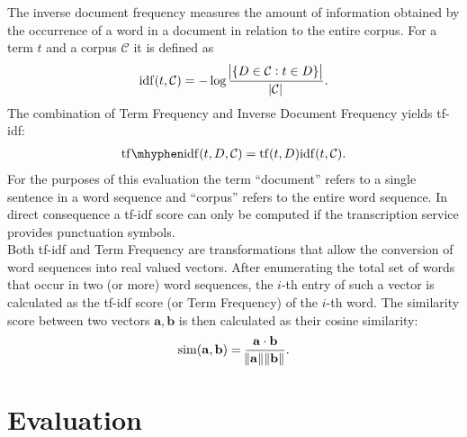 \documentclass[11pt]{article}
\begin{document}
The inverse document frequency measures the amount of information obtained by the occurrence of a word in a document in relation to the entire corpus.
For a term $t$ and a corpus $\mathcal{C}$ it is defined as
\begin{align}
	\mathrm{idf}(t, \mathcal{C}) = -\log \frac{\abs{\{D \in \mathcal{C} : t \in D\}}}{\abs{\mathcal{C}}}.
\end{align}
The combination of Term Frequency and Inverse Document Frequency yields tf-idf: 
\begin{align}
	\mathrm{tf\mhyphen idf}(t, D, \mathcal{C}) = \mathrm{tf}(t, D) \mathrm{idf}(t, \mathcal{C}).
\end{align}
For the purposes of this evaluation the term ``document'' refers to a single sentence in a word sequence and ``corpus'' refers to the entire word sequence.
In direct consequence a tf-idf score can only be computed if the transcription service provides punctuation symbols. \\

Both tf-idf and Term Frequency are transformations that allow the conversion of word sequences into real valued vectors. 
After enumerating the total set of words that occur in two (or more) word sequences, the $i$-th entry of such a vector is calculated as the tf-idf score (or Term Frequency) of the $i$-th word.
The similarity score between two vectors $\mathbf{a}, \mathbf{b}$ is then calculated as their cosine similarity:
\begin{align}
	\mathrm{sim}(\mathbf{a}, \mathbf{b}) = \frac{\mathbf{a} \cdot \mathbf{b}}{\norm{\mathbf{a}} \norm{\mathbf{b}}}.
\end{align}

\section{Evaluation}
\end{document}
